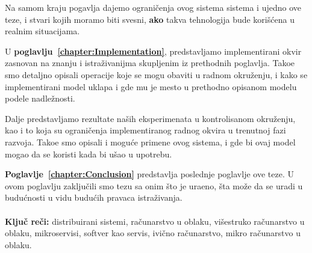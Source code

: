 Na samom kraju pogavlja dajemo ograni\v cenja ovog sistema sistema i ujedno ove teze, i stvari kojih moramo biti svesni, \textbf{ako} takva tehnologija bude kori\v s\'cena u realnim situacijama.

U \textbf{poglavlju~\ref{chapter:Implementation}}, predstavljamo implementirani okvir zasnovan na znanju i istra\v zivanijma skupljenim iz prethodnih poglavlja. Tako\dj e smo detaljno opisali operacije koje se mogu obaviti u radnom okru\v zenju, i kako se implementirani model uklapa i gde mu je mesto u prethodno opisanom modelu podele nadle\v znosti.

Dalje predstavljamo rezultate na\v sih eksperimenata u kontrolisanom okru\v zenju, kao i to koja su ograni\v cenja implementiranog radnog okvira u trenutnoj fazi razvoja. Tako\dj e smo opisali i mogu\'ce primene ovog sistema, i gde bi ovaj model mogao da se koristi kada bi u\v sao u upotrebu.

\textbf{Poglavlje~\ref{chapter:Conclusion}} predstavlja poslednje poglavlje ove teze. U ovom poglavlju zaklju\v cili smo tezu sa onim što je ura\dj eno, \v sta mo\v ze da se uradi u budu\'cnosti u vidu budu\'cih pravaca istra\v zivanja.\\\\

\noindent
\textbf{Klju\v c re\v ci:} distribuirani sistemi, ra\v cunarstvo u oblaku, vi\v sestruko ra\v cunarstvo u oblaku, mikroservisi, softver kao servis, ivi\v cno ra\v cunarstvo, mikro ra\v cunarstvo u oblaku.